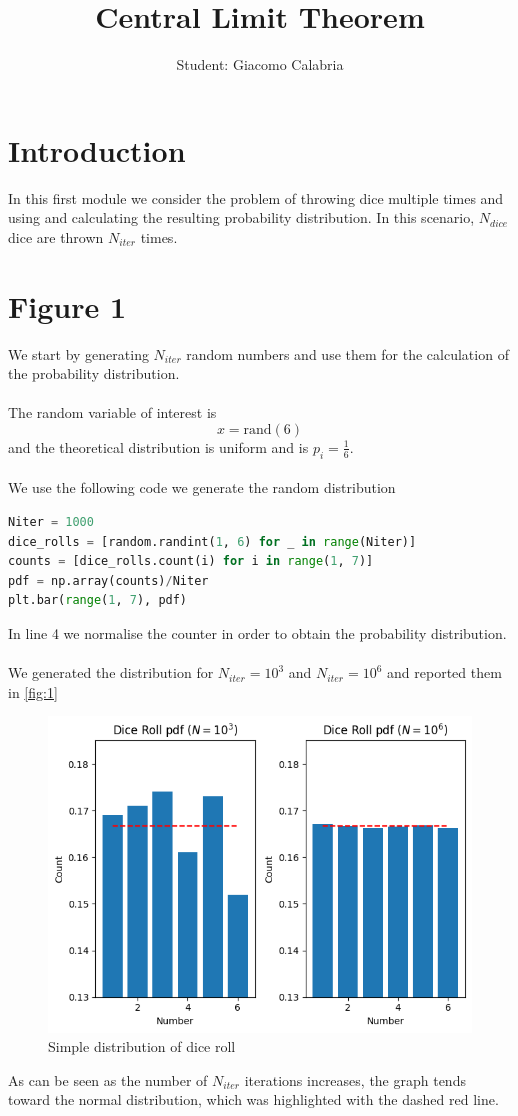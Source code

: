 \documentclass{article}
\title{\textbf{Central Limit Theorem}}
\author{Student: Giacomo Calabria}
\date{}
\begin{document}
\maketitle

\section*{Introduction}
In this first module we consider the problem of throwing dice multiple times and using and calculating the resulting probability distribution. In this scenario, $N_{dice}$ dice are thrown $N_{iter}$ times.
\section{Figure 1}
We start by generating $N_{iter}$ random numbers and use them for the calculation of the probability distribution.\\\\
The random variable of interest is
\begin{equation}
    x=\text{rand}(6)
\end{equation}
and the theoretical distribution is uniform and is $p_i=\frac16$.\\\\
We use the following code we generate the random distribution
\begin{lstlisting}[language=Python]
Niter = 1000
dice_rolls = [random.randint(1, 6) for _ in range(Niter)]
counts = [dice_rolls.count(i) for i in range(1, 7)]
pdf = np.array(counts)/Niter
plt.bar(range(1, 7), pdf)
\end{lstlisting}
In line 4 we normalise the counter in order to obtain the probability distribution.\\\\
We generated the distribution for $N_{iter}=10^3$ and $N_{iter}=10^6$ and reported them in \autoref{fig:1}
\begin{figure}[H]
    \centering
    \includegraphics[width=.7\linewidth]{images/Figure1b.png}
    \caption{Simple distribution of dice roll}
    \label{fig:1}
\end{figure}
\noindent As can be seen as the number of $N_{iter}$ iterations increases, the graph tends toward the normal distribution, which was highlighted with the dashed red line.
\clearpage
\end{document}
